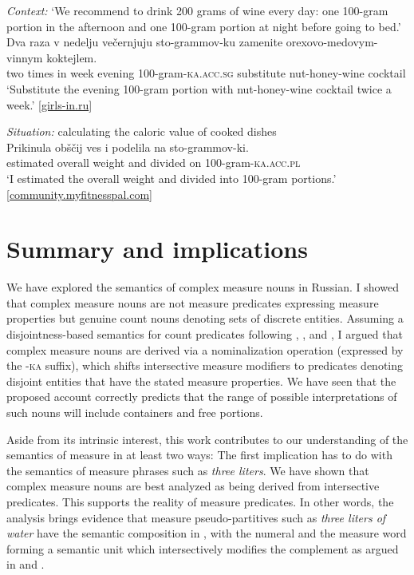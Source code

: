 \documentclass[output=paper,
colorlinks,
citecolor=brown,
newtxmath
]{langscibook}
\begin{document}
\ea\label{ex:39} \textit{Context:} `We recommend to drink 200 grams of wine every day: one 100-gram portion in the afternoon and one 100-gram portion at night before going to bed.'\\
\gll Dva raza v nedelju večernjuju sto-grammov-ku zamenite orexovo-medovym-vinnym koktejlem.\\
two times in week evening 100-gram-\textsc{ka.acc.sg} substitute nut-honey-wine cocktail\\
\glt `Substitute the evening 100-gram portion with nut-honey-wine cocktail twice a week.' \hfill [\href{http://girls-in.ru/pub/1320}{girls-in.ru}]
\z

\ea\label{ex:40} \textit{Situation:} calculating the caloric value of cooked dishes\\
\gll Prikinula obščij ves i podelila na sto-grammov-ki.\\
estimated overall weight and divided on 100-gram-\textsc{ka.acc.pl}\\
\glt `I estimated the overall weight and divided into 100-gram portions.'\\
\glt \hfill [\href{https://community.myfitnesspal.com/ru/discussion/1469795/pomogite-s-podschetami-kaloriynosti-gotovogo-blyuda}{community.myfitnesspal.com}]
\z

%
%

\section{Summary and implications}\label{sec:6}

We have explored the semantics of complex measure nouns in Russian. I showed that complex measure nouns are not measure predicates expressing measure properties but genuine count nouns denoting sets of discrete entities. Assuming a disjointness-based semantics for count predicates following \citet{Rothstein2010,Rothstein2011}, \citet{Rothstein2017}, and \citet{Landman2011,Landman2016}, I argued that complex measure nouns are derived via a nominalization operation (expressed by the -\textsc{ka} suffix), which shifts intersective measure modifiers to predicates denoting disjoint entities that have the stated measure properties. We have seen that the proposed account correctly predicts that the range of possible interpretations of such nouns will include containers and free portions.

Aside from its intrinsic interest, this work contributes to our understanding of the semantics of measure in at least two ways: The first implication has to do with the semantics of measure phrases such as \textit{three liters}. We have shown that complex measure nouns are best analyzed as being derived from intersective predicates. This supports the reality of measure predicates. In other words, the analysis brings evidence that measure pseudo-partitives such as \textit{three liters of water} have the semantic composition in , with the numeral and the measure word forming a semantic unit which intersectively modifies the complement as argued in \citet{Rothstein2009,Rothstein2011,Rothstein2017} and \citet{Landman2004,Landman2016}.
\end{document}
